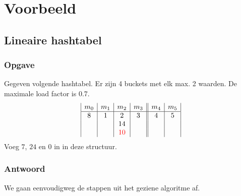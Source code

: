 \documentclass[hashing.tex]{subfiles}
\begin{document}
\chapter{Voorbeeld}
\section{Lineaire hashtabel}
\subsection*{Opgave}
Gegeven volgende hashtabel. Er zijn 4 buckets met elk max. 2 waarden. De maximale load factor is 0.7.
\[
\begin{array}{|c|c|c|c||c|c|}
m_0&m_1&m_2&m_3&m_4&m_5\\
\hline
8 & 1 & 2 & 3 & 4 & 5\\
  &   & 14&   &   &\\
  &   & \color{red}10 & & &
\end{array} 
\]
Voeg $7$, $24$ en $0$ in in deze structuur.
\subsection*{Antwoord}
We gaan eenvoudigweg de stappen uit het geziene algoritme af.
\end{document}
